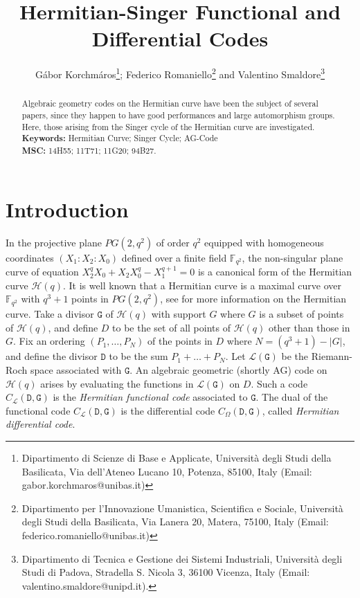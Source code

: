 \documentclass[9pt]{article}
\theoremstyle{plain}
\begin{document}
\author{G\'{a}bor Korchm\'{a}ros\thanks{Dipartimento di Scienze di Base e Applicate,
Universit\`{a} degli Studi della Basilicata, Via dell'Ateneo Lucano 10, Potenza, 85100, Italy (Email: gabor.korchmaros@unibas.it)};
 Federico Romaniello\thanks{Dipartimento per l'Innovazione Umanistica, Scientifica e Sociale, Universit\`{a} degli Studi della Basilicata, Via Lanera 20, Matera, 75100, Italy (Email: federico.romaniello@unibas.it)}
and Valentino Smaldore\thanks{Dipartimento di Tecnica e Gestione dei Sistemi Industriali,
Universit\`{a} degli Studi di Padova, Stradella S. Nicola 3, 36100 Vicenza, Italy (Email: valentino.smaldore@unipd.it).}}
\title{Hermitian-Singer Functional and Differential Codes}
\date{}
\maketitle

\begin{abstract}
Algebraic geometry codes on the Hermitian curve have been the subject of several papers, since they happen to have good performances and large automorphism groups. Here, those arising from the Singer cycle of the Hermitian curve are investigated. \\
\textbf{Keywords:} Hermitian Curve; Singer Cycle; AG-Code\\
\textbf{MSC:} 14H55; 11T71; 11G20; 94B27.



\end{abstract}


\section{Introduction}
In the projective plane $PG(2,q^2)$ of order $q^2$ equipped with homogeneous coordinates $(X_1:X_2:X_0)$ defined over a finite field $\mathbb{F}_{q^2}$, the non-singular plane curve of equation $X_2^qX_0+X_2X_0^q-X_1^{q+1}=0$ is a canonical form of the Hermitian curve ${\mathcal{H}}(q)$. It is well known that a Hermitian curve is a maximal curve over $\mathbb{F}_{q^2}$ with $q^3+1$ points in $PG(2,q^2)$, see \cite{Segre} for more information on the Hermitian curve. Take a divisor $\mathtt {G}$ of ${\mathcal{H}}(q)$ with support $G$ where $G$ is a subset of points of ${\mathcal{H}}(q)$, and define $D$ to be the set of all points of ${\mathcal{H}}(q)$ other than those in $G$. Fix an ordering $(P_1,\ldots,P_N)$ of the points in $D$ where $N=(q^3+1)-|G|$, and define the divisor $\mathtt{D}$ to be the sum $P_1+\ldots+P_N$. Let $\mathcal{L}(\mathtt{G})$ be the Riemann-Roch space associated with $\mathtt{G}$. An algebraic geometric (shortly AG) code on ${\mathcal{H}}(q)$ arises by evaluating the functions in $\mathcal{L}(\mathtt{G})$ on $D$. Such a code $C_{\mathcal{L}}(\mathtt{D},\mathtt{G})$ is the \emph{Hermitian functional code} associated to $\mathtt{G}$.
The dual of the functional code $C_\mathcal{L}(\mathtt{D},\mathtt G)$ is the differential code $C_\Omega(\mathtt{D}, \mathtt G)$, called \emph{Hermitian differential code}. 
\end{document}
